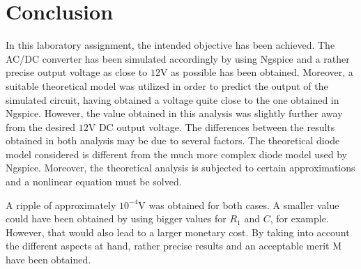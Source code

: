 \section{Conclusion} \label{sec:conclusion}

In this laboratory assignment, the intended objective has been achieved. The AC/DC converter has been simulated accordingly by using Ngspice and a rather precise output voltage as close to $12$V as possible has been obtained. Moreover, a suitable theoretical model was utilized in order to predict the output of the simulated circuit, having obtained a voltage quite close to the one obtained in Ngspice. However, the value obtained in this analysis was slightly further away from the desired $12$V DC output voltage. The differences between the results obtained in both analysis may be due to several factors. The theoretical diode model considered is different from the much more complex diode model used by Ngspice. Moreover, the theoretical analysis is subjected to certain approximations and a nonlinear equation must be solved.
\par
A ripple of approximately $10^{-4}$V was obtained for both cases. A smaller value could have been obtained by using bigger values for $R_1$ and $C$, for example. However, that would also lead to a larger monetary cost. By taking into account the different aspects at hand, rather precise results and an acceptable merit M have been obtained.

